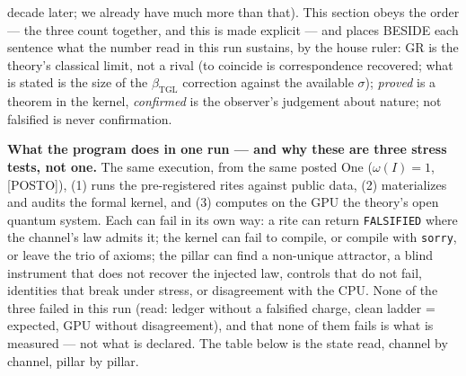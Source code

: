 \documentclass[11pt]{article}
\newcommand{\bTGL}{\beta_{\mathrm{TGL}}}\newcommand{\Msun}{M_{\odot}}\newcommand{\TGL}{\mathrm{TGL}}
\theoremstyle{definition}\newtheorem{deriv}{Derivation}
\begin{document}
decade later; we already have much more than that). This section obeys the order --- the three count together, and this is made explicit --- and places BESIDE each sentence what the number read in this run sustains, by the house ruler: GR is the theory's classical limit, not a rival (to coincide is correspondence recovered; what is stated is the size of the $\bTGL$ correction against the available $\sigma$); \emph{proved} is a theorem in the kernel, \emph{confirmed} is the observer's judgement about nature; not falsified is never confirmation.

\textbf{What the program does in one run --- and why these are three stress tests, not one.} The same execution, from the same posted One ($\omega(I)=1$, \textsf{[POSTO]}), (1) runs the pre-registered rites against public data, (2) materializes and audits the formal kernel, and (3) computes on the GPU the theory's open quantum system. Each can fail in its own way: a rite can return \texttt{FALSIFIED} where the channel's law admits it; the kernel can fail to compile, or compile with \texttt{sorry}, or leave the trio of axioms; the pillar can find a non-unique attractor, a blind instrument that does not recover the injected law, controls that do not fail, identities that break under stress, or disagreement with the CPU. None of the three failed in this run (read: ledger without a falsified charge, clean ladder = expected, GPU without disagreement), and that none of them fails is what is measured --- not what is declared. The table below is the state read, channel by channel, pillar by pillar.
\end{document}
